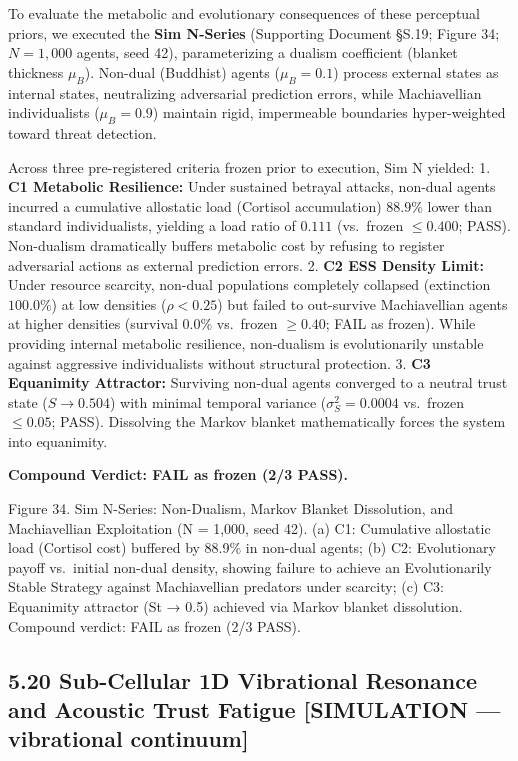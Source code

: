 \documentclass[
]{article}
\begin{document}
To evaluate the metabolic and evolutionary consequences of these
perceptual priors, we executed the \textbf{Sim N-Series} (Supporting
Document §S.19; Figure 34; \(N = 1,000\) agents, seed 42),
parameterizing a dualism coefficient (blanket thickness \(\mu_B\)).
Non-dual (Buddhist) agents (\(\mu_B = 0.1\)) process external states as
internal states, neutralizing adversarial prediction errors, while
Machiavellian individualists (\(\mu_B = 0.9\)) maintain rigid,
impermeable boundaries hyper-weighted toward threat detection.

Across three pre-registered criteria frozen prior to execution, Sim N
yielded: 1. \textbf{C1 Metabolic Resilience:} Under sustained betrayal
attacks, non-dual agents incurred a cumulative allostatic load (Cortisol
accumulation) \(88.9\%\) lower than standard individualists, yielding a
load ratio of \(0.111\) (vs.~frozen \(\le 0.400\); PASS). Non-dualism
dramatically buffers metabolic cost by refusing to register adversarial
actions as external prediction errors. 2. \textbf{C2 ESS Density Limit:}
Under resource scarcity, non-dual populations completely collapsed
(extinction \(100.0\%\)) at low densities (\(\rho < 0.25\)) but failed
to out-survive Machiavellian agents at higher densities (survival
\(0.0\%\) vs.~frozen \(\ge 0.40\); FAIL as frozen). While providing
internal metabolic resilience, non-dualism is evolutionarily unstable
against aggressive individualists without structural protection. 3.
\textbf{C3 Equanimity Attractor:} Surviving non-dual agents converged to
a neutral trust state (\(S \to 0.504\)) with minimal temporal variance
(\(\sigma_S^2 = 0.0004\) vs.~frozen \(\le 0.05\); PASS). Dissolving the
Markov blanket mathematically forces the system into equanimity.

\textbf{Compound Verdict: FAIL as frozen (2/3 PASS).}

Figure 34. Sim N-Series: Non-Dualism, Markov Blanket Dissolution, and
Machiavellian Exploitation ({N = 1,000}, seed 42). (a) C1: Cumulative
allostatic load (Cortisol cost) buffered by 88.9\% in non-dual agents;
(b) C2: Evolutionary payoff vs.~initial non-dual density, showing
failure to achieve an Evolutionarily Stable Strategy against
Machiavellian predators under scarcity; (c) C3: Equanimity attractor
({St → 0.5}) achieved via Markov blanket dissolution. Compound verdict:
FAIL as frozen (2/3 PASS).

\subsection{5.20 Sub-Cellular 1D Vibrational Resonance and Acoustic
Trust Fatigue {[}SIMULATION --- vibrational
continuum{]}}\label{sub-cellular-1d-vibrational-resonance-and-acoustic-trust-fatigue-simulation-vibrational-continuum}
\end{document}
